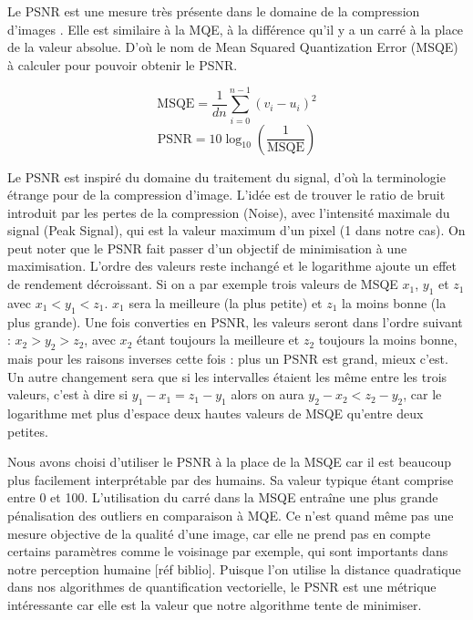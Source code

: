 	Le PSNR est une mesure très présente dans le domaine de la compression d'images \cite{huynh-psnr, korhonen-psnr}. Elle est similaire à la MQE, à la différence qu'il y a un carré à la place de la valeur absolue. D'où le nom de Mean Squared Quantization Error (MSQE) à calculer pour pouvoir obtenir le PSNR.
	
	\begin{equation}
		\text{MSQE} = \frac{1}{dn} \sum_{i=0}^{n-1} (v_i - u_i)^2
	\end{equation}
	\begin{equation}
		\text{PSNR} = 10 \log_{10} (\frac{1}{\text{MSQE}})
	\end{equation}

	Le PSNR est inspiré du domaine du traitement du signal, d'où la terminologie étrange pour de la compression d'image. L'idée est de trouver le ratio de bruit introduit par les pertes de la compression (Noise), avec l'intensité maximale du signal (Peak Signal), qui est la valeur maximum d'un pixel (1 dans notre cas). On peut noter que le PSNR fait passer d'un objectif de minimisation à une maximisation. L'ordre des valeurs reste inchangé et le logarithme ajoute un effet de rendement décroissant. Si on a par exemple trois valeurs de MSQE $x_1$, $y_1$ et $z_1$ avec $x_1 < y_1 < z_1$. $x_1$ sera la meilleure (la plus petite) et $z_1$ la moins bonne (la plus grande). Une fois converties en PSNR, les valeurs seront dans l'ordre suivant : $x_2 > y_2 > z_2$, avec $x_2$ étant toujours la meilleure et $z_2$ toujours la moins bonne, mais pour les raisons inverses cette fois : plus un PSNR est grand, mieux c'est. Un autre changement sera que si les intervalles étaient les même entre les trois valeurs, c'est à dire si $y_1 - x_1 = z_1 - y_1$ alors on aura $y_2 - x_2 < z_2 - y_2$, car le logarithme met plus d'espace deux hautes valeurs de MSQE qu'entre deux petites.

	Nous avons choisi d'utiliser le PSNR à la place de la MSQE car il est beaucoup plus facilement interprétable par des humains. Sa valeur typique étant comprise entre 0 et 100. L'utilisation du carré dans la MSQE entraîne une plus grande pénalisation des outliers en comparaison à MQE. Ce n'est quand même pas une mesure objective de la qualité d'une image, car elle ne prend pas en compte certains paramètres comme le voisinage par exemple, qui sont importants dans notre perception humaine [réf biblio]. Puisque l'on utilise la distance quadratique dans nos algorithmes de quantification vectorielle, le PSNR est une métrique intéressante car elle est la valeur que notre algorithme tente de minimiser.
	
